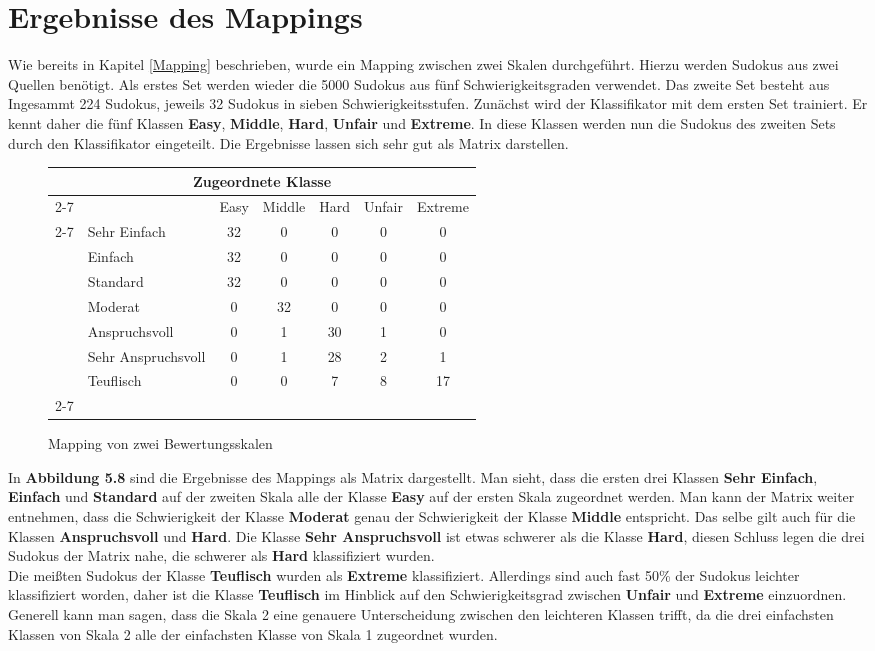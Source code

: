 \newpage
\section{Ergebnisse des Mappings}
Wie bereits in Kapitel \ref{Mapping} beschrieben, wurde ein Mapping zwischen zwei Skalen durchgeführt. Hierzu werden Sudokus aus zwei Quellen benötigt. Als erstes Set werden wieder die 5000 Sudokus aus fünf Schwierigkeitsgraden verwendet. Das zweite Set besteht aus Ingesammt 224 Sudokus, jeweils 32 Sudokus in sieben Schwierigkeitsstufen. Zunächst wird der Klassifikator mit dem ersten Set trainiert. Er kennt daher die fünf Klassen \textbf{Easy}, \textbf{Middle}, \textbf{Hard}, \textbf{Unfair} und \textbf{Extreme}. In diese Klassen werden nun die Sudokus des zweiten Sets durch den Klassifikator eingeteilt. Die Ergebnisse lassen sich sehr gut als Matrix darstellen.\\
\begin{figure}[H]
\centering
\begin{tabular}{ l | l |  c  c  c  c  c |}
\multicolumn{7}{c}{\textbf{Zugeordnete Klasse}}\\
\cline{2-7}
\multirow{6}{*}{\begin{turn}{90}\textbf{Ursprüngliche Klasse}\end{turn}}
&  & Easy & Middle & Hard & Unfair & Extreme\\
\cline{2-7}
& Sehr Einfach & 32 & 0 & 0 & 0 & 0\\
& Einfach & 32 & 0 & 0 & 0 & 0\\
& Standard & 32 & 0 & 0 & 0 & 0\\
& Moderat & 0 & 32 & 0 & 0 & 0\\
& Anspruchsvoll & 0 & 1 & 30 & 1 & 0\\
& Sehr Anspruchsvoll & 0 & 1 & 28 & 2 & 1\\
& Teuflisch & 0 & 0 & 7 & 8 & 17\\
\cline{2-7}
\end{tabular}
\caption{Mapping von zwei Bewertungsskalen}
\end{figure}
In \textbf{Abbildung 5.8} sind die Ergebnisse des Mappings als Matrix dargestellt. Man sieht, dass die ersten drei Klassen \textbf{Sehr Einfach}, \textbf{Einfach} und \textbf{Standard} auf der zweiten Skala alle der Klasse \textbf{Easy} auf der ersten Skala zugeordnet werden. Man kann der Matrix weiter entnehmen, dass die Schwierigkeit der Klasse \textbf{Moderat} genau der Schwierigkeit der Klasse \textbf{Middle} entspricht. Das selbe gilt auch für die Klassen \textbf{Anspruchsvoll} und \textbf{Hard}.
Die Klasse \textbf{Sehr Anspruchsvoll} ist etwas schwerer als die Klasse \textbf{Hard}, diesen Schluss legen die drei Sudokus der Matrix nahe, die schwerer als \textbf{Hard} klassifiziert wurden.\\
Die meißten Sudokus der Klasse \textbf{Teuflisch} wurden als \textbf{Extreme} klassifiziert. Allerdings sind auch fast 50\% der Sudokus leichter klassifiziert worden, daher ist die Klasse \textbf{Teuflisch} im Hinblick auf den Schwierigkeitsgrad zwischen \textbf{Unfair} und \textbf{Extreme} einzuordnen. Generell kann man sagen, dass die Skala 2 eine genauere Unterscheidung zwischen den leichteren Klassen trifft, da die drei einfachsten Klassen von Skala 2 alle der einfachsten Klasse von Skala 1 zugeordnet wurden.